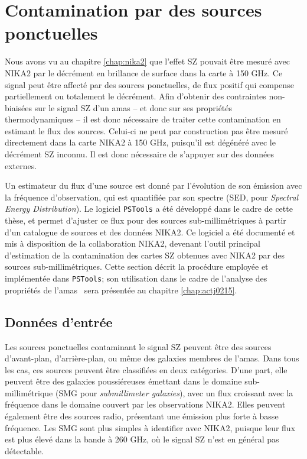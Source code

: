 \section{Contamination par des sources ponctuelles}
\label{sec:decor:pstools}

Nous avons vu au chapitre \ref{chap:nika2} que l'effet SZ pouvait être mesuré avec NIKA2 par le décrément en brillance de surface dans la carte à 150 GHz.
Ce signal peut être affecté par des sources ponctuelles, de flux positif qui compense partiellement ou totalement le décrément.
Afin d'obtenir des contraintes non-biaisées sur le signal SZ d'un amas -- et donc sur ses propriétés thermodynamiques -- il est donc nécessaire de traiter cette contamination en estimant le flux des sources.
Celui-ci ne peut par construction pas être mesuré directement dans la carte NIKA2 à 150 GHz, puisqu'il est dégénéré avec le décrément SZ inconnu.
Il est donc nécessaire de s'appuyer sur des données externes.

Un estimateur du flux d'une source est donné par l'évolution de son émission avec la fréquence d'observation, qui est quantifiée par son spectre (SED, pour \textit{Spectral Energy Distribution}).
Le logiciel \texttt{PSTools} a été développé dans le cadre de cette thèse, et permet d'ajuster ce flux pour des sources sub-millimétriques à partir d'un catalogue de sources et des données NIKA2.
Ce logiciel a été documenté et mis à disposition de la collaboration NIKA2, devenant l'outil principal d'estimation de la contamination des cartes SZ obtenues avec NIKA2 par des sources sub-millimétriques.
Cette section décrit la procédure employée et implémentée dans \texttt{PSTools}; son utilisation dans le cadre de l'analyse des propriétés de l'amas \act\ sera présentée au chapitre \ref{chap:actj0215}.

\subsection{Données d'entrée}

Les sources ponctuelles contaminant le signal SZ peuvent être des sources d'avant-plan, d'arrière-plan, ou même des galaxies membres de l'amas.
Dans tous les cas, ces sources peuvent être classifiées en deux catégories.
D'une part, elle peuvent être des galaxies poussiéreuses émettant dans le domaine sub-millimétrique (SMG pour \textit{submillimeter galaxies}), avec un flux croissant avec la fréquence dans le domaine couvert par les observations NIKA2.
Elles peuvent également être des sources radio, présentant une émission plus forte à basse fréquence\footnotemark.
Les SMG sont plus simples à identifier avec NIKA2, puisque leur flux est plus élevé dans la bande à 260 GHz, où le signal SZ n'est en général pas détectable.

